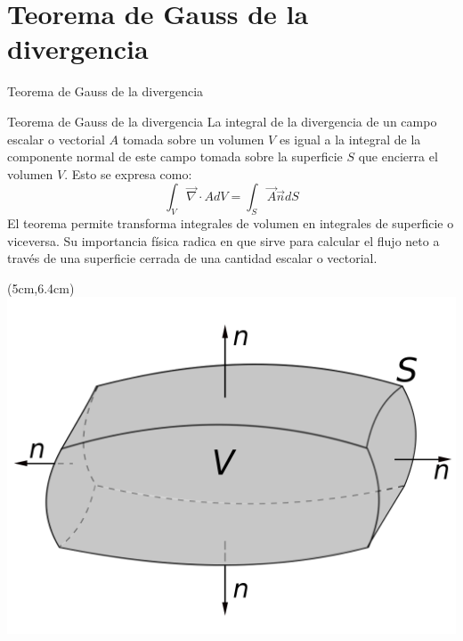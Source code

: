 \documentclass [xcolor=svgnames, t] {beamer}
\begin{document}
\section{Teorema de Gauss de la divergencia}
\begin{frame}{Teorema de Gauss de la divergencia}
\vspace{-0.5cm}
\begin{block}{Teorema de Gauss de la divergencia}
La integral de la divergencia de un campo escalar o vectorial $A$ tomada sobre un volumen $V$ es igual a la integral de la componente normal de este campo tomada sobre la superficie $S$ que encierra el volumen $V$. Esto se expresa como:
\begin{equation}
\int_V \vec{\nabla} \cdot A dV = \int_S \vec{A} \vec{n}  dS 
\label{tga}
\end{equation}
El teorema permite transforma integrales de volumen en integrales de superficie o viceversa. Su importancia f\'isica radica en que sirve para calcular el flujo neto a trav\'es de una superficie cerrada de una cantidad escalar o vectorial.
\end{block}
\begin{textblock*}{4cm}(5cm,6.4cm) %
\includegraphics[width=\textwidth]{gau}
\end{textblock*}
\end{frame}
\end{document}
